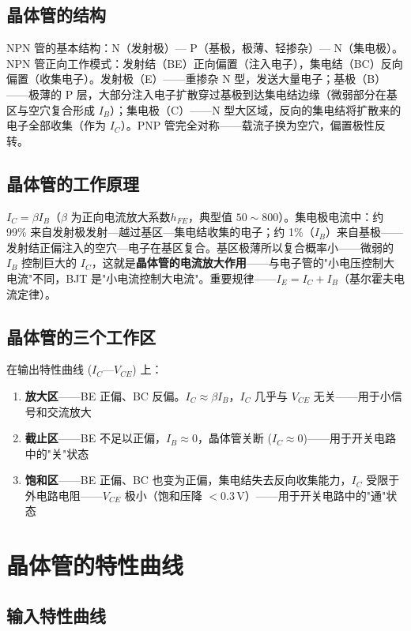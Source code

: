 \documentclass[12pt,UTF8]{ctexbook}
\begin{document}
\subsection{晶体管的结构}

NPN 管的基本结构：N（发射极）— P（基极，极薄、轻掺杂）— N（集电极）。NPN 管正向工作模式：发射结（BE）正向偏置（注入电子），集电结（BC）反向偏置（收集电子）。发射极（E）——重掺杂 N 型，发送大量电子；基极（B）——极薄的 P 层，大部分注入电子扩散穿过基极到达集电结边缘（微弱部分在基区与空穴复合形成 $I_B$）；集电极（C）——N 型大区域，反向的集电结将扩散来的电子全部收集（作为 $I_C$）。PNP 管完全对称——载流子换为空穴，偏置极性反转。

\subsection{晶体管的工作原理}

$I_C = \beta I_B$（$\beta$ 为正向电流放大系数$h_{FE}$，典型值 $50\sim800$）。集电极电流中：约 99\% 来自发射极发射—越过基区—集电结收集的电子；约 1\%（$I_B$）来自基极——发射结正偏注入的空穴—电子在基区复合。基区极薄所以复合概率小——微弱的 $I_B$ 控制巨大的 $I_C$，这就是\textbf{晶体管的电流放大作用}——与电子管的"小电压控制大电流"不同，BJT 是"小电流控制大电流"。重要规律——$I_E = I_C + I_B$（基尔霍夫电流定律）。

\subsection{晶体管的三个工作区}

在输出特性曲线 ($I_C$—$V_{CE}$) 上：
\begin{enumerate}
\item \textbf{放大区}——BE 正偏、BC 反偏。$I_C \approx \beta I_B$，$I_C$ 几乎与 $V_{CE}$ 无关——用于小信号和交流放大
\item \textbf{截止区}——BE 不足以正偏，$I_B\approx0$，晶体管关断 ($I_C\approx0$)——用于开关电路中的"关"状态
\item \textbf{饱和区}——BE 正偏、BC 也变为正偏，集电结失去反向收集能力，$I_C$ 受限于外电路电阻——$V_{CE}$ 极小（饱和压降 $<0.3\,\mathrm{V}$）——用于开关电路中的"通"状态
\end{enumerate}

\section{晶体管的特性曲线}
\label{sec:bjt_characteristics}

\subsection{输入特性曲线}
\end{document}
